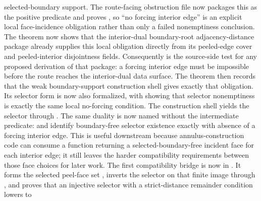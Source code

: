 \documentclass[11pt]{article}
\begin{document}
\begin{itemize}
selected-boundary support.  The route-facing obstruction file now packages this
as the positive predicate
 and proves
,
so ``no forcing interior edge'' is an explicit local face-incidence obligation
rather than only a failed nonemptiness conclusion.  The theorem
now shows that the interior-dual boundary-root adjacency-distance package
already supplies this local obligation directly from its peeled-edge cover and
peeled-interior disjointness fields.  Consequently
is the source-side test for any proposed derivation of that package: a forcing
interior edge must be impossible before the route reaches the interior-dual
data surface.  The theorem
then records that the weak boundary-support construction shell gives exactly
that obligation.  Its selector form
 is now also formalized, with
showing that selector nonemptiness is exactly the same local no-forcing
condition.  The construction shell yields the selector through
.
The same duality is now named without the intermediate predicate:
and
identify boundary-free selector existence exactly with absence of a forcing
interior edge.
This is useful downstream because annulus-construction code can consume a
function returning a selected-boundary-free incident face for each interior
edge; it still leaves the harder compatibility requirements between those face
choices for later work.  The first compatibility bridge is now in
.  It forms the selected
peel-face set
, inverts the selector on that
finite image through
, and proves that an
injective selector with a strict-distance remainder condition lowers to

\end{itemize}
\end{document}
